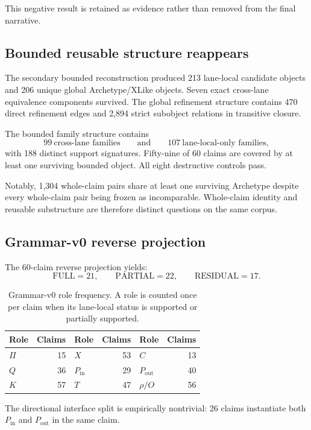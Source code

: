 \documentclass[11pt]{article}
\newcommand{\Pin}{P_{\mathrm{in}}}
\newcommand{\Pout}{P_{\mathrm{out}}}
\begin{document}
This negative result is retained as evidence rather than removed from the final narrative.

\subsection{Bounded reusable structure reappears}

The secondary bounded reconstruction produced 213 lane-local candidate objects and 206 unique global Archetype/XLike objects. Seven exact cross-lane equivalence components survived. The global refinement structure contains 470 direct refinement edges and 2,894 strict subobject relations in transitive closure.

The bounded family structure contains
\[
99\ \text{cross-lane families}
\qquad\text{and}\qquad
107\ \text{lane-local-only families},
\]
with 188 distinct support signatures. Fifty-nine of 60 claims are covered by at least one surviving bounded object. All eight destructive controls pass.

Notably, 1,304 whole-claim pairs share at least one surviving Archetype despite every whole-claim pair being frozen as incomparable. Whole-claim identity and reusable substructure are therefore distinct questions on the same corpus.

\subsection{Grammar-v0 reverse projection}

The 60-claim reverse projection yields:
\[
\text{FULL}=21,
\qquad
\text{PARTIAL}=22,
\qquad
\text{RESIDUAL}=17.
\]

\begin{table}[htbp]
\centering
\caption{Grammar-v0 role frequency. A role is counted once per claim when its lane-local status is supported or partially supported.}
\label{tab:roles}
\begin{tabular}{lr@{\qquad}lr@{\qquad}lr}
\toprule
Role & Claims & Role & Claims & Role & Claims \\
\midrule
\(\Pi\) & 15 & \(X\) & 53 & \(C\) & 13 \\
\(Q\) & 36 & \(\Pin\) & 29 & \(\Pout\) & 40 \\
\(K\) & 57 & \(T\) & 47 & \(\rho/O\) & 56 \\
\bottomrule
\end{tabular}
\end{table}

The directional interface split is empirically nontrivial: 26 claims instantiate both \(\Pin\) and \(\Pout\) in the same claim.
\end{document}
